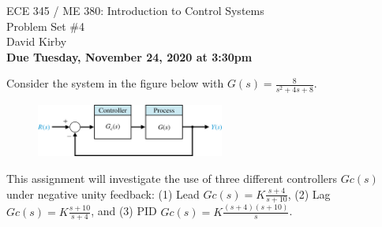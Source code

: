 \documentclass[11pt]{article}
\begin{document}
\begin{center}
\LARGE{ECE 345 / ME 380: Introduction to Control Systems\\Problem Set \#4}\\[1.5em]
\large David Kirby\\[1.5em]
\large \textbf{Due Tuesday, November 24, 2020 at 3:30pm}\\[2.5em]
\end{center}

\noindent Consider the system in the figure below with \(G(s)=\displaystyle\frac{8}{s^2+4s+8}\).\par
    \begin{figure}[h!]
    \centering
    \includegraphics[width=0.55\textwidth]{./Images/Fig05-001.png}
    \end{figure}
\noindent This assignment will investigate the use of three different controllers \(Gc(s)\) under negative unity feedback: (1) Lead \(Gc(s) = K \frac{s+4}{s+10}\), (2) Lag \(Gc(s) = K \frac{s+10}{s+4}\), and (3) PID \(Gc(s) = K \frac{(s+4)(s+10)}{s}\).
\end{document}
